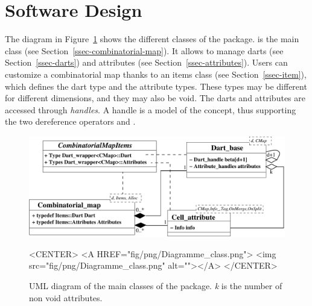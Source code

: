 \section{Software Design}\label{sec-software-design}
The diagram in Figure~\ref{fig-diagram_class} shows the different
classes of the package.   is the main class
(see Section~\ref{ssec-combinatorial-map}). It allows to manage darts
(see Section~\ref{ssec-darts}) and attributes (see
Section~\ref{ssec-attributes}).
Users can customize a combinatorial map thanks to an items class (see
Section~\ref{ssec-item}), which defines the dart type and the
attribute types. These types may be different for different
dimensions, and they may also be void.  The darts and attributes are
accessed through \emph{handles}. A handle is a model of the
 concept, thus supporting the two dereference operators
 and .

\begin{figure}
  \begin{ccTexOnly}
    \begin{center}
      \includegraphics[width=.95\textwidth]
      {Combinatorial_map/fig/pdf/Diagramme_class}
    \end{center}
  \end{ccTexOnly}
  \begin{ccHtmlOnly}
    <CENTER>
    <A HREF="fig/png/Diagramme_class.png">
        <img src="fig/png/Diagramme_class.png" alt=""></A>
    </CENTER>
    \end{ccHtmlOnly}
    \caption{UML diagram of the main classes of the package. \emph{k} is the number of
      non void attributes.}
    \label{fig-diagram_class}
\end{figure}



